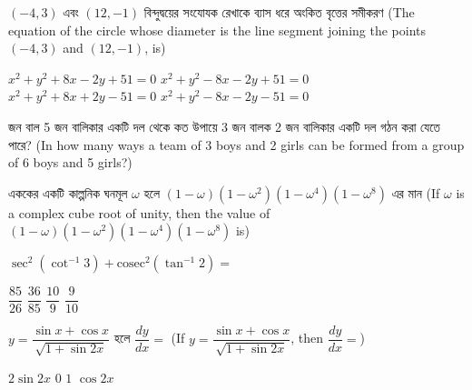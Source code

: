 \documentclass[addpoints]{exam}
\begin{document}
\begin{questions}
\begin{oneparchoices}
\end{oneparchoices}

\question  $ (-4,3) $ এবং $ (12,-1) $ বিন্দুদ্বয়ের সংযোযক রেখাকে ব্যাস ধরে অংকিত বৃত্তের সমীকরণ (The equation of the circle whose diameter is the line segment joining the points $ (-4,3) $ and $ (12,-1) $, is)

\begin{oneparchoices}
\choice $ x^{2} + y^{2}+8x-2y+51=0 $
\hspace*{.5cm} \choice $ x^{2} + y^{2}-8x-2y+51=0 $\\
\hspace*{-.45cm} \choice $ x^{2} + y^{2}+8x+2y-51=0 $
\hspace*{.5cm} \choice $ x^{2} + y^{2}-8x-2y-51=0 $
\end{oneparchoices}

 জন বাল 5 জন বালিকার একটি দল থেকে কত উপায়ে 3 জন বালক 2 জন বালিকার একটি দল গঠন করা যেতে পারে? (In how many ways a team of 3 boys and 2 girls can be formed from a group of 6 boys and 5 girls?)

\begin{oneparchoices}

\end{oneparchoices}

\question    এককের একটি কাল্পনিক ঘনমূল $ \omega $ হলে $ (1-\omega)(1-\omega^{2})(1-\omega^{4})(1-\omega^{8}) $ এর মান (If $ \omega $ is a complex cube root of unity, then the value of $ (1-\omega)(1-\omega^{2})(1-\omega^{4})(1-\omega^{8}) $ is) 

\begin{oneparchoices}

\end{oneparchoices}

\question  $ \sec^{2}(\cot^{-1}3) +\text{cosec}^{2}(\tan^{-1}2) = $

\begin{oneparchoices}
\choice $ \dfrac{85}{26} $
\choice $ \dfrac{36}{85} $
\choice $ \dfrac{10}{9} $
\choice  $ \dfrac{9}{10} $

\end{oneparchoices}

\question  $ y=\dfrac{\sin x + \cos x}{\sqrt{1+\sin 2x}} $ হলে $ \dfrac{dy}{dx} = $ (If $ y=\dfrac{\sin x + \cos x}{\sqrt{1+\sin 2x}} $, then  $ \dfrac{dy}{dx} = $)

\begin{oneparchoices}
\choice $ 2\sin 2x $
\choice $ 0 $
\choice $ 1 $
\choice  $ \cos 2x $


\end{oneparchoices}
\end{questions}
\end{document}
